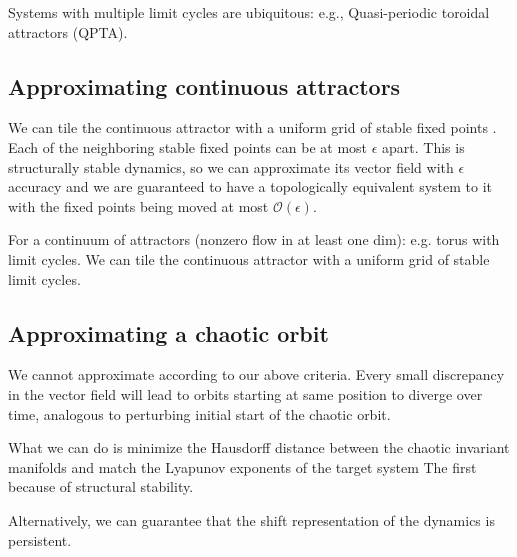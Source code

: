 \documentclass{article}
\theoremstyle{definition}
\theoremstyle{remark}
\newcounter{ct}
\begin{document}
Systems with multiple limit cycles are ubiquitous: e.g., Quasi-periodic toroidal attractors (QPTA)\citep{Park2023a}.



\subsection{Approximating continuous attractors}\label{sec:chaos}

We can tile the continuous attractor with a uniform grid of stable fixed points \citep{Sagodi2024a}.
Each of the neighboring stable fixed points can be at most $\epsilon$ apart.
This is structurally stable dynamics, so we can approximate its vector field with $\epsilon$ accuracy and we are guaranteed to have a topologically equivalent system to it with the fixed points being moved at most $\mathcal{O}(\epsilon)$. 


For a continuum of attractors (nonzero flow in at least one dim): e.g. torus with limit cycles.
We can tile the continuous attractor with a uniform grid of stable limit cycles.





\subsection{Approximating a chaotic orbit}
We cannot approximate according to our above criteria.
Every small discrepancy in the vector field will lead to orbits starting at same position to diverge over time, analogous to perturbing initial start of the chaotic orbit.


What we can do is minimize the Hausdorff distance between the chaotic invariant manifolds and match the Lyapunov exponents of the target system
The first because of structural stability.


Alternatively, we can guarantee that the shift representation of the dynamics is persistent.
\end{document}
